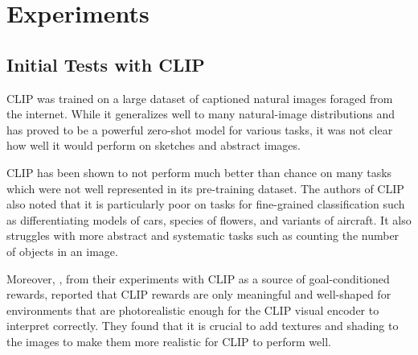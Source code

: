 \chapter{Experiments}
\label{sec:experiments}


\section{Initial Tests with CLIP}
\label{sec:clip-custom}

CLIP was trained on a large dataset of captioned natural images foraged from the internet.
While it generalizes well to many natural-image distributions and has proved to be a powerful zero-shot model for various tasks, it was not clear how well it would perform on sketches and abstract images. 

CLIP has been shown to not perform much better than chance on many tasks which were not well represented in its pre-training dataset.
The authors of CLIP also noted that it is particularly poor on tasks for fine-grained classification such as differentiating models of cars, species of flowers, and variants of aircraft.
It also struggles with more abstract and systematic tasks such as counting the number of objects in an image.

Moreover, \cite{vlmrm}, from their experiments with CLIP as a source of goal-conditioned rewards, reported that CLIP rewards are only meaningful and well-shaped for environments that are photorealistic enough for the CLIP visual encoder to interpret correctly.
They found that it is crucial to add textures and shading to the images to make them more realistic for CLIP to perform well.

